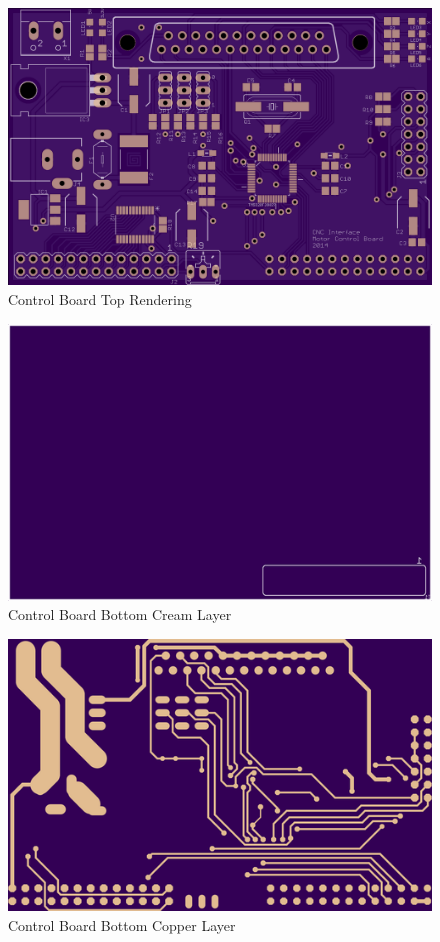 \begin{figure}[h]
	\centering
	\includegraphics[width=1\textwidth]{pcb-design/ctoprender.png}
	\caption{Control Board Top Rendering}
	\label{fig:control-top-render}
\end{figure}
\begin{figure}[h]
	\centering
	\includegraphics[width=1\textwidth]{pcb-design/cbottomcream.png}
	\caption{Control Board Bottom Cream Layer}
	\label{fig:control-bottom-cream}
\end{figure}
\begin{figure}[h]
	\centering
	\includegraphics[width=1\textwidth]{pcb-design/cbottomroute.png}
	\caption{Control Board Bottom Copper Layer}
	\label{fig:control-bottom-copper}
\end{figure}
